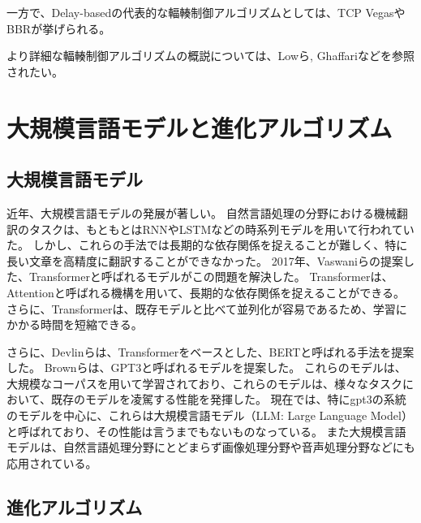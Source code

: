 \documentclass[a4paper,11pt]{jreport}
\begin{document}
一方で、Delay-basedの代表的な輻輳制御アルゴリズムとしては、TCP Vegas\cite{tcp-vegas}やBBR\cite{bbr}が挙げられる。

より詳細な輻輳制御アルゴリズムの概説については、Lowら\cite{980245}, Ghaffari\cite{GHAFFARI2015101}などを参照されたい。

\section{大規模言語モデルと進化アルゴリズム}

\subsection{大規模言語モデル}

近年、大規模言語モデルの発展が著しい。
自然言語処理の分野における機械翻訳のタスクは、もともとはRNN\cite{graves2014generating}やLSTM\cite{6795963}などの時系列モデルを用いて行われていた。
しかし、これらの手法では長期的な依存関係を捉えることが難しく、特に長い文章を高精度に翻訳することができなかった。
2017年、Vaswaniら\cite{attention}の提案した、Transformerと呼ばれるモデルがこの問題を解決した。
Transformerは、Attentionと呼ばれる機構を用いて、長期的な依存関係を捉えることができる。
さらに、Transformerは、既存モデルと比べて並列化が容易であるため、学習にかかる時間を短縮できる。

さらに、Devlinら\cite{devlin2019bert}は、Transformerをベースとした、BERTと呼ばれる手法を提案した。
Brownら\cite{gpt3}は、GPT3と呼ばれるモデルを提案した。
これらのモデルは、大規模なコーパスを用いて学習されており、これらのモデルは、様々なタスクにおいて、既存のモデルを凌駕する性能を発揮した。
現在では、特にgpt3の系統のモデルを中心に、これらは大規模言語モデル（LLM: Large Language Model）と呼ばれており、その性能は言うまでもないものなっている。
また大規模言語モデルは、自然言語処理分野にとどまらず画像処理分野や音声処理分野などにも応用されている。

\subsection{進化アルゴリズム}
\end{document}
